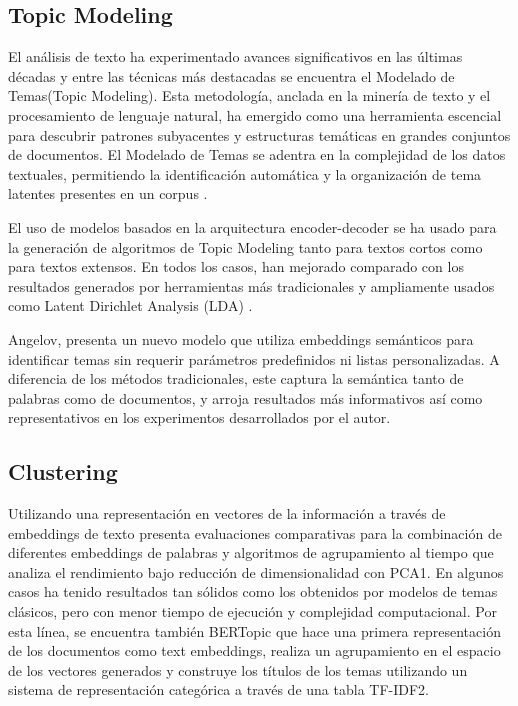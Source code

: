 \documentclass[12pt,twocolumn]{article}
\begin{document}
\subsection{Topic Modeling}
El análisis de texto ha experimentado avances significativos en las últimas décadas y entre las técnicas más destacadas se encuentra el Modelado de Temas(Topic Modeling). 
Esta metodología, anclada en la minería de texto y el procesamiento de lenguaje natural, ha emergido como una herramienta escencial para descubrir patrones subyacentes y estructuras temáticas en grandes conjuntos de documentos. 
El Modelado de Temas se adentra en la complejidad de los datos textuales, permitiendo la identificación automática y la organización de tema latentes presentes en un corpus \parencite{lopez2024generacion}.

El uso de modelos basados en la arquitectura encoder-decoder se ha usado para la generación de algoritmos de Topic Modeling tanto para textos cortos como para textos extensos. 
En todos los casos, han mejorado comparado con los resultados generados por herramientas más tradicionales y ampliamente usados como Latent Dirichlet Analysis (LDA) \parencite{blei2003latent}.

Angelov, \parencite{angelov2020top2vec} presenta un nuevo modelo que utiliza embeddings semánticos para identificar temas sin requerir parámetros predefinidos ni listas personalizadas. 
A diferencia de los métodos tradicionales, este captura la semántica tanto de palabras como de documentos, y arroja resultados más informativos así como representativos en los experimentos desarrollados por el autor.
\subsection{Clustering}
Utilizando una representación en vectores de la información a través de embeddings de texto \parencite{sia2020tired} presenta evaluaciones comparativas para la combinación de diferentes embeddings de palabras y algoritmos de agrupamiento al tiempo que analiza el rendimiento bajo reducción de dimensionalidad con PCA1.
En algunos casos ha tenido resultados tan sólidos como los obtenidos por modelos de temas clásicos, pero con menor tiempo de ejecución y complejidad computacional. 
Por esta línea, se encuentra también BERTopic \parencite{grootendorst2022bertopic} que hace una primera representación de los documentos como text embeddings, realiza un agrupamiento en el espacio de los vectores generados y construye los títulos de los temas utilizando un sistema de representación categórica a través de una tabla TF-IDF2.
\end{document}
